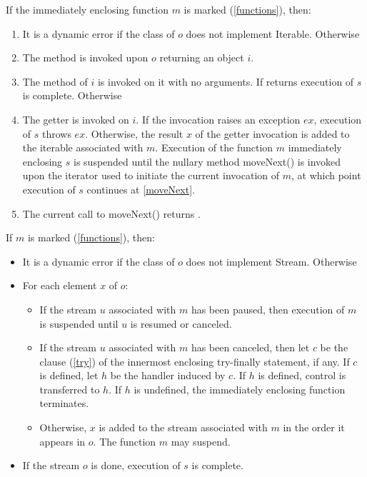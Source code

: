 \documentclass{article}
\newcommand{\code}[1]{{\sf #1}}
\begin{document}
\LMHash{}
If the immediately enclosing function $m$ is marked \SYNC* (\ref{functions}), then:
\begin{enumerate}
\item It is a dynamic error if the class of $o$ does not implement \code{Iterable}.  Otherwise
\item The method  is invoked upon $o$ returning an object $i$.
\item \label{moveNext} The  method of $i$ is invoked on it with no arguments. If  returns \FALSE{} execution of $s$ is complete. Otherwise
\item The getter  is invoked on $i$. If the invocation raises an exception $ex$, execution of $s$ throws $ex$. Otherwise, the result $x$ of the getter invocation is added to the iterable associated with $m$.
Execution of the function $m$ immediately enclosing $s$ is suspended until the nullary method \code{moveNext()} is invoked upon the iterator used to initiate the current invocation of $m$, at which point execution of $s$ continues at \ref{moveNext}.
\item
The current call to \code{moveNext()} returns \TRUE.
\end{enumerate}

\LMHash{}
If $m$ is marked \ASYNC* (\ref{functions}), then:
\begin{itemize}
\item  It is a dynamic error if the class of $o$ does not implement \code{Stream}. Otherwise
\item For each element $x$ of $o$:
\begin{itemize}
\item
If the stream $u$ associated with $m$ has been paused,  then execution of $m$ is suspended until $u$ is resumed or canceled.
 \item
If the stream $u$ associated with $m$ has been canceled, then let $c$ be the \FINALLY{} clause (\ref{try}) of the innermost enclosing try-finally statement, if any. If $c$ is defined,  let $h$ be the handler induced by $c$. If $h$ is defined, control is transferred to $h$. If $h$ is undefined, the immediately enclosing function terminates.
\item
Otherwise,  $x$ is added to the stream associated with $m$ in the order it appears in $o$.  The function $m$ may suspend.
\end{itemize}
\item If the stream $o$ is done, execution of $s$ is complete.
\end{itemize}
\end{document}
